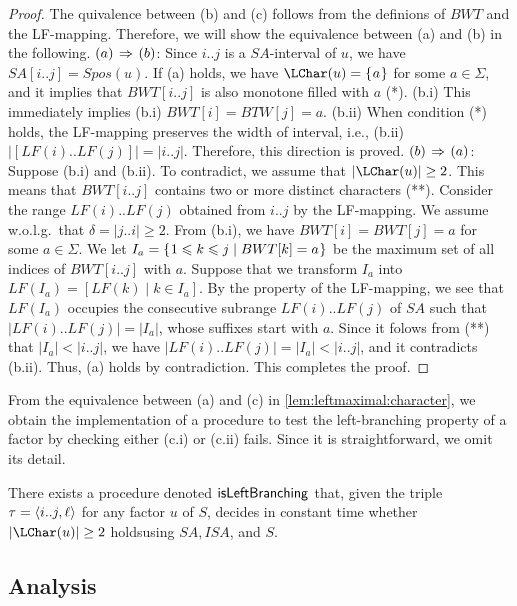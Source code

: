 \documentclass{article}
\begin{document}
\begin{proof}
The quivalence between (b) and (c) follows from the definions of $BWT$ and the LF-mapping. Therefore, we will show the equivalence between (a) and (b) in the following. 
$(a)\Implies (b)$: 
Since $i..j$ is a $SA$-interval of $u$, we have $SA[i..j]=Spos(u)$. If (a) holds, we have 
$\LChar(u) = \set{a}$ for some $a\in \Sigma$, and it implies that $BWT[i..j]$ is also monotone filled with $a$ (*). 
(b.i) This immediately implies (b.i) $BWT[i]=BTW[j] = a$. 
(b.ii) When condition (*) holds, the LF-mapping preserves the width of interval, i.e., (b.ii) $|[LF(i)..LF(j)]| = |i..j|$. Therefore, this direction is proved. 
$(b) \Implies (a)$: 
Suppose (b.i) and (b.ii). To contradict, we assume that $|\LChar(u)|\ge 2$. This means that $BWT[i..j]$ contains two or more distinct characters (**). 
Consider the range $LF(i)..LF(j)$ obtained from $i..j$ by the LF-mapping. We assume w.o.l.g.~that $\delta = |j..i|\ge 2$. 
From (b.i), we have $BWT[i] = BWT[j] = a$ for some $a \in \Sigma$. 
We let $I_a = \set{\btw k1j \mid BWT[k] = a}$ be the maximum set of all indices of $BWT[i..j]$ with $a$. 
Suppose that we transform $I_a$ into $LF(I_a) = [ LF(k) \mid k \in I_a]$. By the property of the LF-mapping, we see that $LF(I_a)$ occupies the consecutive subrange $LF(i)..LF(j)$ of $SA$ such that $|LF(i)..LF(j)| = |I_a|$, whose suffixes start with $a$. Since it folows from (**) that $|I_a| < |i..j|$, we have $|LF(i)..LF(j)| = |I_a|< |i..j|$, and it contradicts (b.ii). Thus, (a) holds by contradiction. This completes the proof. 
\end{proof}

From the equivalence between (a) and (c) in \cref{lem:leftmaximal:character}, we obtain the implementation of a procedure to test the left-branching property of a factor by checking either (c.i) or (c.ii) fails. Since it is straightforward, we omit its detail. 

\begin{lemma}\label{lem:test:leftbranch}
There exists a procedure denoted  $\isLeftBranching[]$ that, given the triple $\tau = \pair{i..j, \ell}$ for any factor $u$ of $S$, decides  in constant time whether $|\LChar(u)|\ge 2$ holdsusing $SA, ISA$, and $S$. 
\end{lemma}



\subsection{Analysis}
\end{document}
